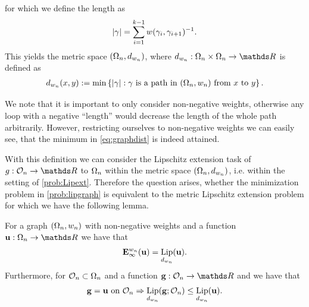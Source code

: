 %
for which we define the length as
%
\begin{align*}
\left|\gamma\right| = \sum_{i=1}^{k-1} w(\gamma_i, \gamma_{i+1})^{-1}.
\end{align*}
%
This yields the metric space $(\Omega_n, d_{w_n})$, where $d_{w_n}:\domain_n\times\domain_n\to\R$ is defined as
%
\begin{align}\label{eq:graphdist}
d_{w_n}(x,y) := \min \left\{ \left|\gamma\right|: \gamma \text{ is a path in } 
(\Omega_n, w_n)\text{ from } x \text{ to } y\right\}.
\end{align}
%
\begin{remark}{}{}
We note that it is important to only consider non-negative weights, otherwise any loop with a negative \enquote{length} would decrease the 
length of the whole path arbitrarily. However, restricting ourselves to non-negative weights we can easily see, that the minimum in \cref{eq:graphdist} is indeed attained.
\end{remark}
%
With this definition we can consider the Lipschitz extension task of $g:\conset_n\to\R$ to $\Omega_n$ within the metric space $(\Omega_n,d_{w_n})$, i.e. within the setting of \cref{prob:Lipext}. Therefore the question arises, whether the minimization problem in \cref{prob:lipgraph} is equivalent to the metric Lipschitz extension problem for which we have the following lemma.
%
%
\begin{lemma}{}{}
For a graph $(\Omega_n, w_n)$ with non-negative weights and a function $\vec u:\domain_n\to\R$ we have that 
\begin{align*}
\mathbf{E}_\infty^{w_n}(\mathbf{u}) = \operatorname*{Lip}_{d_{w_n}}(\mathbf{u}).
\end{align*}
%
Furthermore, for $\mathcal{O}_n\subset\Omega_n$ and a function $\vec g:\conset_n\to\R$ and we have that
%
\begin{align*}
\mathbf{g} = \mathbf{u} \text{ on } \mathcal{O}_n\Rightarrow
\operatorname*{Lip}_{d_{w_n}}(\mathbf{g};\mathcal{O}_n) \leq \operatorname*{Lip}_{d_{w_n}}(\mathbf{u}).
\end{align*}
\end{lemma}
%
%
